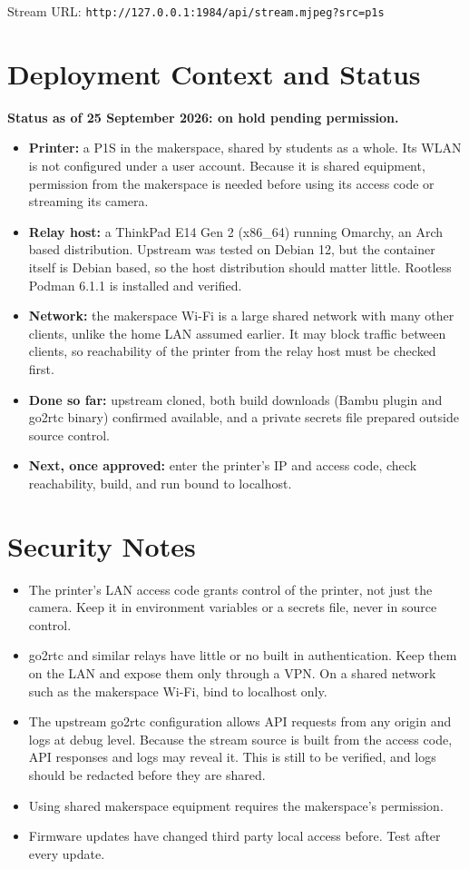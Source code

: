 \documentclass[11pt]{article}
\begin{document}
Stream URL: \texttt{http://127.0.0.1:1984/api/stream.mjpeg?src=p1s}

\section{Deployment Context and Status}
\textbf{Status as of 25 September 2026: on hold pending permission.}

\begin{itemize}[itemsep=2pt]
  \item \textbf{Printer:} a P1S in the makerspace, shared by students as a whole. Its WLAN
        is not configured under a user account. Because it is shared equipment, permission
        from the makerspace is needed before using its access code or streaming its camera.
  \item \textbf{Relay host:} a ThinkPad E14 Gen 2 (x86\_64) running Omarchy, an Arch based
        distribution. Upstream was tested on Debian 12, but the container itself is Debian
        based, so the host distribution should matter little. Rootless Podman 6.1.1 is
        installed and verified.
  \item \textbf{Network:} the makerspace Wi-Fi is a large shared network with many other
        clients, unlike the home LAN assumed earlier. It may block traffic between clients,
        so reachability of the printer from the relay host must be checked first.
  \item \textbf{Done so far:} upstream cloned, both build downloads (Bambu plugin and go2rtc
        binary) confirmed available, and a private secrets file prepared outside source
        control.
  \item \textbf{Next, once approved:} enter the printer's IP and access code,
        check reachability, build, and run bound to localhost.
\end{itemize}

\section{Security Notes}
\begin{itemize}[itemsep=2pt]
  \item The printer's LAN access code grants control of the printer, not just the camera.
        Keep it in environment variables or a secrets file, never in source control.
  \item go2rtc and similar relays have little or no built in authentication. Keep them on the
        LAN and expose them only through a VPN. On a shared network such as the makerspace
        Wi-Fi, bind to localhost only.
  \item The upstream go2rtc configuration allows API requests from any origin and logs at
        debug level. Because the stream source is built from the access code, API responses
        and logs may reveal it. This is still to be verified, and logs should be redacted
        before they are shared.
  \item Using shared makerspace equipment requires the makerspace's permission.
  \item Firmware updates have changed third party local access before. Test after every update.
\end{itemize}
\end{document}
